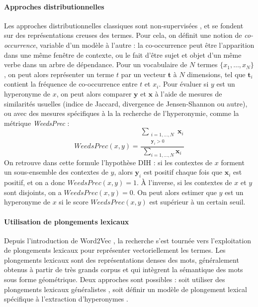 \paragraph{Approches distributionnelles}

Les approches distributionnelles classiques sont non-supervisées \cite{weeds-etal-2004-characterising}, et se fondent sur des représentations creuses des termes. Pour cela, on définit une notion de \textit{co-occurrence}, variable d'un modèle à l'autre : la co-occurrence peut être l'apparition dans une même fenêtre de contexte, ou le fait d'être sujet et objet d'un même verbe dans un arbre de dépendance. Pour un vocabulaire de $N$ termes $\{x_1, \ldots, x_N\}$, on peut alors représenter un terme $t$ par un vecteur $\textbf{t}$ à $N$ dimensions, tel que $\textbf{t}_i$ contient la fréquence de co-occurrence entre $t$ et $x_i$. Pour évaluer si $y$ est un hyperonyme de $x$, on peut alors comparer $\textbf{y}$ et $\textbf{x}$ à l'aide de mesures de similarités usuelles (indice de Jaccard, divergence de Jensen-Shannon ou autre), ou avec des mesures spécifiques à la la recherche de l'hyperonymie, comme la métrique \textit{WeedsPrec} \cite{weeds-etal-2004-characterising} :
\begin{equation}
    WeedsPrec(x, y) = \frac{\displaystyle \sum_{\substack{i=1, \ldots, N \\ \textbf{y}_i > 0}} \textbf{x}_i}{\displaystyle \sum_{i =1, \ldots, N } \textbf{x}_i}
\end{equation}
On retrouve dans cette formule l'hypothèse DIH : si les contextes de $x$ forment un sous-ensemble des contextes de $y$, alors $\textbf{y}_i$ est positif chaque fois que $\textbf{x}_i$ est positif, et on a donc $WeedsPrec(x, y) = 1$. À l'inverse, si les contextes de $x$ et $y$ sont disjoints, on a $WeedsPrec(x, y) = 0$. On peut alors estimer que $y$ est un hyperonyme de $x$ si le score $WeedsPrec(x, y)$ est supérieur à un certain seuil.

\paragraph{Utilisation de plongements lexicaux}
 
Depuis l'introduction de Word2Vec \cite{mikolov2013distributed}, la recherche s'est tournée vers l'exploitation de plongements lexicaux pour représenter vectoriellement les termes. Les plongements lexicaux sont des représentations denses des mots, généralement obtenus à partir de très grands corpus et qui intègrent la sémantique des mots sous forme géométrique.
Deux approches sont possibles : soit utiliser des plongements lexicaux généralistes \cite{fu2014learning, gupta2016domain, atzori2020fully, pocostales-2016-nuig}, soit définir un modèle de plongement lexical spécifique à l'extraction d'hyperonymes \cite{nguyen-etal-2017-hierarchical, nickel2017poincare, nickel2018learning, yu2015learning, luu-etal-2016-learning, vendrov2015order}. 

